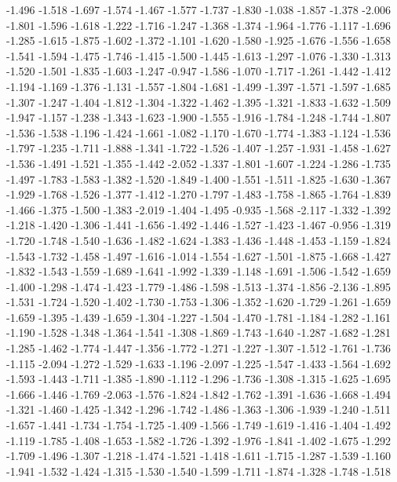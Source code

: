 \documentclass[9pt]{article}
\theoremstyle{plain}
\theoremstyle{definition}
\theoremstyle{remark}
\numberwithin{equation}{section}
\begin{document}
-1.496
-1.518
-1.697
-1.574
-1.467
-1.577
-1.737
-1.830
-1.038
-1.857
-1.378
-2.006
-1.801
-1.596
-1.618
-1.222
-1.716
-1.247
-1.368
-1.374
-1.964
-1.776
-1.117
-1.696
-1.285
-1.615
-1.875
-1.602
-1.372
-1.101
-1.620
-1.580
-1.925
-1.676
-1.556
-1.658
-1.541
-1.594
-1.475
-1.746
-1.415
-1.500
-1.445
-1.613
-1.297
-1.076
-1.330
-1.313
-1.520
-1.501
-1.835
-1.603
-1.247
-0.947
-1.586
-1.070
-1.717
-1.261
-1.442
-1.412
-1.194
-1.169
-1.376
-1.131
-1.557
-1.804
-1.681
-1.499
-1.397
-1.571
-1.597
-1.685
-1.307
-1.247
-1.404
-1.812
-1.304
-1.322
-1.462
-1.395
-1.321
-1.833
-1.632
-1.509
-1.947
-1.157
-1.238
-1.343
-1.623
-1.900
-1.555
-1.916
-1.784
-1.248
-1.744
-1.807
-1.536
-1.538
-1.196
-1.424
-1.661
-1.082
-1.170
-1.670
-1.774
-1.383
-1.124
-1.536
-1.797
-1.235
-1.711
-1.888
-1.341
-1.722
-1.526
-1.407
-1.257
-1.931
-1.458
-1.627
-1.536
-1.491
-1.521
-1.355
-1.442
-2.052
-1.337
-1.801
-1.607
-1.224
-1.286
-1.735
-1.497
-1.783
-1.583
-1.382
-1.520
-1.849
-1.400
-1.551
-1.511
-1.825
-1.630
-1.367
-1.929
-1.768
-1.526
-1.377
-1.412
-1.270
-1.797
-1.483
-1.758
-1.865
-1.764
-1.839
-1.466
-1.375
-1.500
-1.383
-2.019
-1.404
-1.495
-0.935
-1.568
-2.117
-1.332
-1.392
-1.218
-1.420
-1.306
-1.441
-1.656
-1.492
-1.446
-1.527
-1.423
-1.467
-0.956
-1.319
-1.720
-1.748
-1.540
-1.636
-1.482
-1.624
-1.383
-1.436
-1.448
-1.453
-1.159
-1.824
-1.543
-1.732
-1.458
-1.497
-1.616
-1.014
-1.554
-1.627
-1.501
-1.875
-1.668
-1.427
-1.832
-1.543
-1.559
-1.689
-1.641
-1.992
-1.339
-1.148
-1.691
-1.506
-1.542
-1.659
-1.400
-1.298
-1.474
-1.423
-1.779
-1.486
-1.598
-1.513
-1.374
-1.856
-2.136
-1.895
-1.531
-1.724
-1.520
-1.402
-1.730
-1.753
-1.306
-1.352
-1.620
-1.729
-1.261
-1.659
-1.659
-1.395
-1.439
-1.659
-1.304
-1.227
-1.504
-1.470
-1.781
-1.184
-1.282
-1.161
-1.190
-1.528
-1.348
-1.364
-1.541
-1.308
-1.869
-1.743
-1.640
-1.287
-1.682
-1.281
-1.285
-1.462
-1.774
-1.447
-1.356
-1.772
-1.271
-1.227
-1.307
-1.512
-1.761
-1.736
-1.115
-2.094
-1.272
-1.529
-1.633
-1.196
-2.097
-1.225
-1.547
-1.433
-1.564
-1.692
-1.593
-1.443
-1.711
-1.385
-1.890
-1.112
-1.296
-1.736
-1.308
-1.315
-1.625
-1.695
-1.666
-1.446
-1.769
-2.063
-1.576
-1.824
-1.842
-1.762
-1.391
-1.636
-1.668
-1.494
-1.321
-1.460
-1.425
-1.342
-1.296
-1.742
-1.486
-1.363
-1.306
-1.939
-1.240
-1.511
-1.657
-1.441
-1.734
-1.754
-1.725
-1.409
-1.566
-1.749
-1.619
-1.416
-1.404
-1.492
-1.119
-1.785
-1.408
-1.653
-1.582
-1.726
-1.392
-1.976
-1.841
-1.402
-1.675
-1.292
-1.709
-1.496
-1.307
-1.218
-1.474
-1.521
-1.418
-1.611
-1.715
-1.287
-1.539
-1.160
-1.941
-1.532
-1.424
-1.315
-1.530
-1.540
-1.599
-1.711
-1.874
-1.328
-1.748
-1.518
\end{document}
